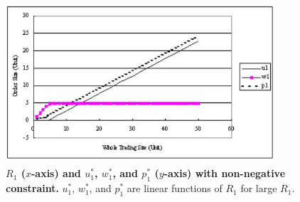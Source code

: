 \begin{figure}
\begin{center}
 \includegraphics[width=10cm,height=6cm]{fg_l2n.png}
\end{center}
\caption[$R_1$ and $u_1^*$, $w_1^*$, and $p_1^*$ with non-negative constraint]
{{\bf $R_1$ ($x$-axis) and $u_1^*$, $w_1^*$, and $p_1^*$ ($y$-axis) with non-negative constraint.}
 \quad $u_1^*$, $w_1^*$, and $p_1^*$ are linear functions of $R_1$ for large $R_1$.}\label{fg_l2}
\end{figure}

